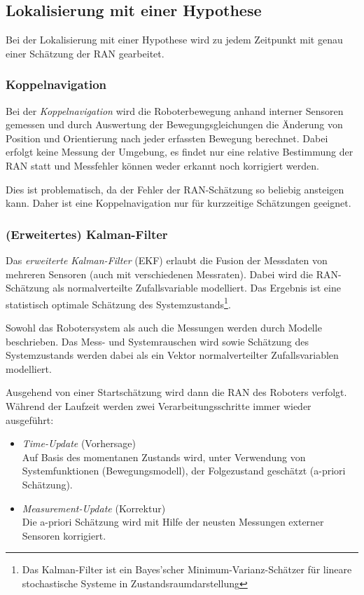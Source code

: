 		\subsection{Lokalisierung mit einer Hypothese}
			Bei der Lokalisierung mit einer Hypothese wird zu jedem Zeitpunkt mit genau einer Schätzung der RAN gearbeitet.

			\subsubsection{Koppelnavigation}
				Bei der \emph{Koppelnavigation} wird die Roboterbewegung anhand interner Sensoren gemessen und durch Auswertung der Bewegungsgleichungen die Änderung von Position und Orientierung nach jeder erfassten Bewegung berechnet. Dabei erfolgt keine Messung der Umgebung, \dh es findet nur eine relative Bestimmung der RAN statt und Messfehler können weder erkannt noch korrigiert werden.

				Dies ist problematisch, da der Fehler der RAN-Schätzung so beliebig ansteigen kann. Daher ist eine Koppelnavigation nur für kurzzeitige Schätzungen geeignet.

			\subsubsection{(Erweitertes) Kalman-Filter}
				Das \emph{erweiterte Kalman-Filter} (EKF) erlaubt die Fusion der Messdaten von mehreren Sensoren (auch mit verschiedenen Messraten). Dabei wird die RAN-Schätzung als normalverteilte Zufallsvariable modelliert. Das Ergebnis ist eine statistisch optimale Schätzung des Systemzustands\footnote{Das Kalman-Filter ist ein Bayes'scher Minimum-Varianz-Schätzer für lineare stochastische Systeme in Zustandsraumdarstellung}.

				Sowohl das Robotersystem als auch die Messungen werden durch Modelle beschrieben. Das Mess- und Systemrauschen wird sowie Schätzung des Systemzustands werden dabei als ein Vektor normalverteilter Zufallsvariablen modelliert.

				Ausgehend von einer Startschätzung wird dann die RAN des Roboters verfolgt. Während der Laufzeit werden zwei Verarbeitungsschritte immer wieder ausgeführt:
				\begin{itemize}
					\item \emph{Time-Update} (Vorhersage) \\ Auf Basis des momentanen Zustands wird, unter Verwendung von Systemfunktionen (Bewegungsmodell), der Folgezustand geschätzt (a-priori Schätzung).
					\item \emph{Measurement-Update} (Korrektur) \\ Die a-priori Schätzung wird mit Hilfe der neusten Messungen externer Sensoren korrigiert.
				\end{itemize}


